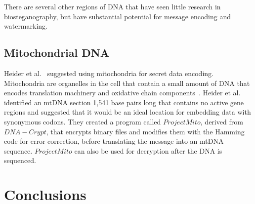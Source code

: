 \documentclass[USenglish,oneside,twocolumn]{article}
\begin{document}
There are several other regions of DNA that have seen little research in biosteganography, but have substantial potential for message encoding and watermarking.

\subsection{Mitochondrial DNA}

Heider et al.~\cite{HKB2008B} suggested using mitochondria for secret data encoding. Mitochondria are organelles in the cell that contain a small amount of DNA that encodes translation machinery and oxidative chain components~\cite{GV2001G}. Heider et al. identified an mtDNA section 1,541 base pairs long that contains no active gene regions and suggested that it would be an ideal location for embedding data with synonymous codons. They created a program called $Project Mito$, derived from $DNA-Crypt$, that encrypts binary files and modifies them with the Hamming code for error correction, before translating the message into an mtDNA sequence. $Project Mito$ can also be used for decryption after the DNA is sequenced.

\section{Conclusions}



\end{document}
